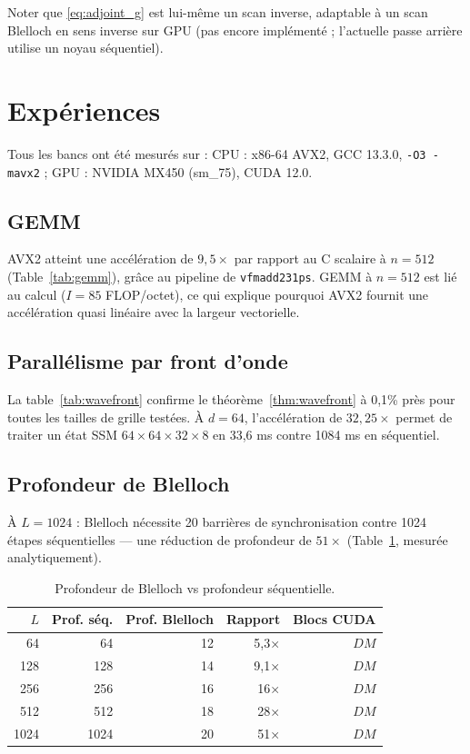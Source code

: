 \documentclass[10pt,onecolumn]{article}
\begin{document}
Noter que \eqref{eq:adjoint_g} est lui-même un scan inverse, adaptable à
un scan Blelloch en sens inverse sur GPU (pas encore implémenté ;
l'actuelle passe arrière utilise un noyau séquentiel).

\section{Expériences}
\label{sec:experiments}

Tous les bancs ont été mesurés sur :
CPU : x86-64 AVX2, GCC 13.3.0, \texttt{-O3 -mavx2} ;
GPU : NVIDIA MX450 (sm\_75), CUDA 12.0.

\subsection{GEMM}
AVX2 atteint une accélération de $9,5\times$ par rapport au C scalaire à $n = 512$
(Table~\ref{tab:gemm}), grâce au pipeline de \texttt{vfmadd231ps}.
GEMM à $n = 512$ est lié au calcul ($I = 85$ FLOP/octet),
ce qui explique pourquoi AVX2 fournit une accélération quasi linéaire avec
la largeur vectorielle.

\subsection{Parallélisme par front d'onde}
La table~\ref{tab:wavefront} confirme le théorème~\ref{thm:wavefront}
à 0,1\% près pour toutes les tailles de grille testées.
À $d = 64$, l'accélération de $32,25\times$ permet de traiter un état SSM
$64 \times 64 \times 32 \times 8$ en 33,6 ms contre 1084 ms en séquentiel.

\subsection{Profondeur de Blelloch}
À $L = 1024$ : Blelloch nécessite 20 barrières de synchronisation contre
1024 étapes séquentielles — une réduction de profondeur de $51\times$
(Table~\ref{tab:blelloch}, mesurée analytiquement).

\begin{table}[htbp]
\centering
\caption{Profondeur de Blelloch vs profondeur séquentielle.}
\label{tab:blelloch}
\begin{tabular}{rrrrr}
\toprule
$L$ & Prof. séq. & Prof. Blelloch & Rapport & Blocs CUDA \\
\midrule
  64 & 64 & 12 & 5,3× & $DM$ \\
 128 & 128 & 14 & 9,1× & $DM$ \\
 256 & 256 & 16 & 16× & $DM$ \\
 512 & 512 & 18 & 28× & $DM$ \\
1024 & 1024 & 20 & 51× & $DM$ \\
\bottomrule
\end{tabular}
\end{table}
\end{document}

